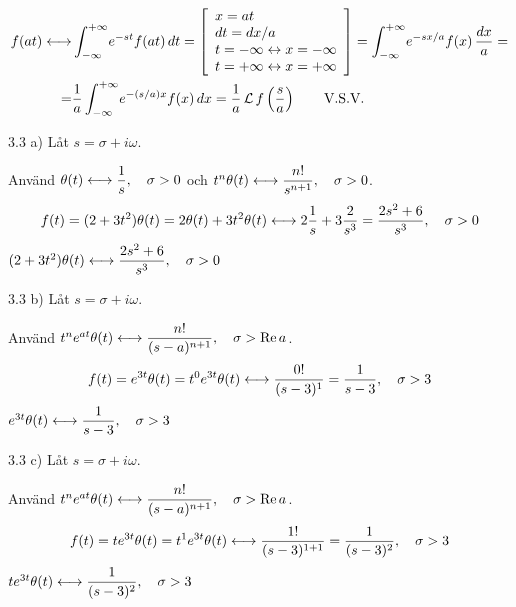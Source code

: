 \begin{task}{3.2}
	\begin{align*}
	f(at)\longleftrightarrow
	&\int_{-\infty}^{+\infty}\! e^{-st}f(at) \, dt=
	\left[\begin{array}{l}
	x=at \\
	dt=dx/a \\
	t=-\infty\leftrightarrow x=-\infty \\
	t=+\infty\leftrightarrow x=+\infty
	\end{array}\right] =
	\int_{-\infty}^{+\infty}\! e^{-sx/a}f(x) \, \frac{dx}{a}= \\ =
	&\frac{1}{a}\int_{-\infty}^{+\infty}\! e^{-(s/a)x}f(x) \, dx=
	\frac{1}{a}\operatorname{\mathcal{L}} f\left(\frac{s}{a}\right)\text{\qquad V.S.V.}
	\end{align*}
\end{task}

\begin{task}{3.3 a)}
	Låt $s=\sigma+i\omega$.
	
	Använd $\theta(t)\longleftrightarrow \dfrac{1}{s}, \quad \sigma > 0$ och $t^n\theta(t)\longleftrightarrow\dfrac{n!}{s^{n+1}}, \quad \sigma > 0$.
	\begin{align*}
	f(t)=
	(2+3t^2)\theta(t)=
	2\theta(t)+3t^2\theta(t)\longleftrightarrow
	2\frac{1}{s}+3\frac{2}{s^3}=
	\frac{2s^2+6}{s^3}, \quad \sigma > 0
	\end{align*}
	\ans $(2+3t^2)\theta(t)\longleftrightarrow\dfrac{2s^2+6}{s^3}, \quad \sigma > 0$
\end{task}

\begin{task}{3.3 b)}
	Låt $s=\sigma+i\omega$.
	
	Använd $t^ne^{at}\theta(t)\longleftrightarrow \dfrac{n!}{(s-a)^{n+1}}, \quad \sigma > \operatorname{Re} a$.
	\begin{align*}
	f(t)=
	e^{3t}\theta(t)=
	t^0e^{3t}\theta(t)\longleftrightarrow
	\frac{0!}{(s-3)^{1}}=
	\frac{1}{s-3}, \quad \sigma > 3
	\end{align*}
	\ans $e^{3t}\theta(t)\longleftrightarrow\dfrac{1}{s-3}, \quad \sigma > 3$
\end{task}

\begin{task}{3.3 c)}
	Låt $s=\sigma+i\omega$.
	
	Använd $t^ne^{at}\theta(t)\longleftrightarrow \dfrac{n!}{(s-a)^{n+1}}, \quad \sigma > \operatorname{Re} a$.
	\begin{align*}
	f(t)=
	te^{3t}\theta(t)=
	t^1e^{3t}\theta(t)\longleftrightarrow
	\frac{1!}{(s-3)^{1+1}}=
	\frac{1}{(s-3)^2}, \quad \sigma > 3
	\end{align*}
	\ans $te^{3t}\theta(t)\longleftrightarrow\dfrac{1}{(s-3)^2}, \quad \sigma > 3$
\end{task}

